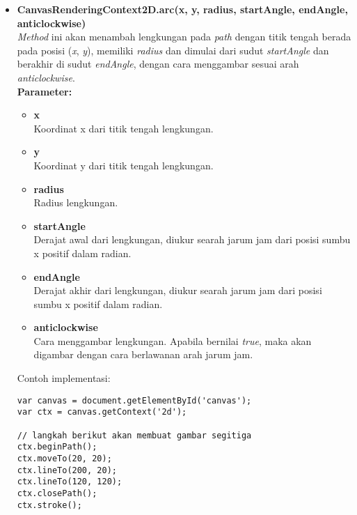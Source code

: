 \begin{enumerate}
\begin{itemize}
		\item \textbf{CanvasRenderingContext2D.arc(x, y, radius, startAngle, endAngle, anticlockwise)} \\
		\textit{Method} ini akan menambah lengkungan pada \textit{path} dengan titik tengah berada pada posisi (\textit{x}, \textit{y}), memiliki \textit{radius} dan dimulai dari sudut \textit{startAngle} dan berakhir di sudut \textit{endAngle}, dengan cara menggambar sesuai arah \textit{anticlockwise}. \\
		\textbf{Parameter:}
		\begin{itemize}
			\item \textbf{x} \\ Koordinat x dari titik tengah lengkungan.
			\item \textbf{y} \\ Koordinat y dari titik tengah lengkungan.
			\item \textbf{radius} \\ Radius lengkungan.
			\item \textbf{startAngle} \\ Derajat awal dari lengkungan, diukur searah jarum jam dari posisi sumbu x positif dalam radian.
			\item \textbf{endAngle} \\ Derajat akhir dari lengkungan, diukur searah jarum jam dari posisi sumbu x positif dalam radian.
			\item \textbf{anticlockwise} \\ Cara menggambar lengkungan. Apabila bernilai \textit{true}, maka akan digambar dengan cara berlawanan arah jarum jam.
		\end{itemize}
		
		Contoh implementasi:
\begin{lstlisting}
var canvas = document.getElementById('canvas');
var ctx = canvas.getContext('2d');
	
// langkah berikut akan membuat gambar segitiga
ctx.beginPath();
ctx.moveTo(20, 20);
ctx.lineTo(200, 20);
ctx.lineTo(120, 120);
ctx.closePath(); 
ctx.stroke();
\end{lstlisting}
		
	\end{itemize} 

\end{enumerate}
